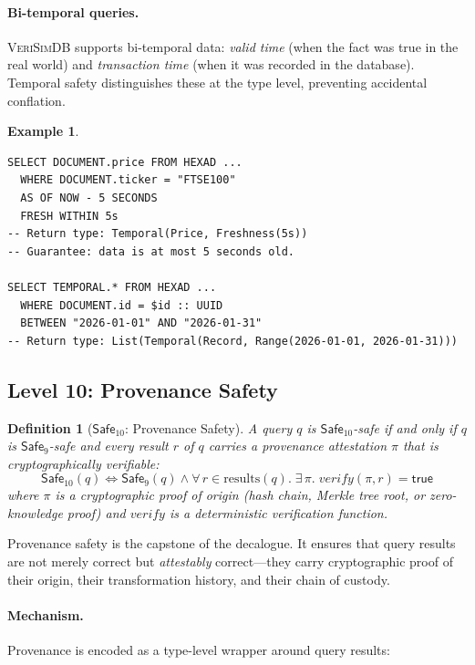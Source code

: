 \documentclass[11pt,a4paper]{article}
\newtheorem{definition}[theorem]{Definition}
\newtheorem{example}[theorem]{Example}
\newcommand{\VeriSimDB}{\textsc{VeriSimDB}}
\newcommand{\Safe}[1]{\ensuremath{\mathsf{Safe}_{#1}}}
\begin{document}
\paragraph{Bi-temporal queries.}
\VeriSimDB{} supports bi-temporal data: \emph{valid time} (when the
fact was true in the real world) and \emph{transaction time} (when it
was recorded in the database).  Temporal safety distinguishes these
at the type level, preventing accidental conflation.

\begin{example}
\begin{lstlisting}[language=VCL]
SELECT DOCUMENT.price FROM HEXAD ...
  WHERE DOCUMENT.ticker = "FTSE100"
  AS OF NOW - 5 SECONDS
  FRESH WITHIN 5s
-- Return type: Temporal(Price, Freshness(5s))
-- Guarantee: data is at most 5 seconds old.

SELECT TEMPORAL.* FROM HEXAD ...
  WHERE DOCUMENT.id = $id :: UUID
  BETWEEN "2026-01-01" AND "2026-01-31"
-- Return type: List(Temporal(Record, Range(2026-01-01, 2026-01-31)))
\end{lstlisting}
\end{example}

\subsection{Level 10: Provenance Safety}\label{sec:L10}

\begin{definition}[\Safe{10}: Provenance Safety]
A query $q$ is \Safe{10}-safe if and only if $q$ is \Safe{9}-safe and
every result $r$ of $q$ carries a provenance attestation $\pi$ that
is cryptographically verifiable:
\[
  \Safe{10}(q) \iff \Safe{9}(q) \land
  \forall\, r \in \mathrm{results}(q).\;
  \exists\, \pi.\; \mathit{verify}(\pi, r) = \mathsf{true}
\]
where $\pi$ is a cryptographic proof of origin (hash chain, Merkle
tree root, or zero-knowledge proof) and $\mathit{verify}$ is a
deterministic verification function.
\end{definition}

Provenance safety is the capstone of the decalogue.  It ensures that
query results are not merely correct but \emph{attestably}
correct---they carry cryptographic proof of their origin, their
transformation history, and their chain of custody.

\paragraph{Mechanism.}
Provenance is encoded as a type-level wrapper around query results:
\end{document}
